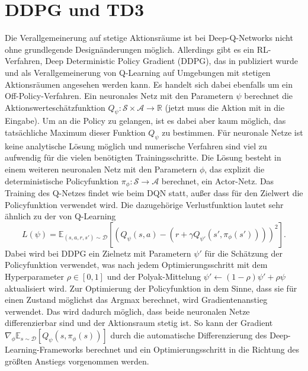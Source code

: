 \section{DDPG und TD3}
Die Verallgemeinerung auf stetige Aktionsräume ist bei Deep-Q-Networks nicht ohne grundlegende Designänderungen möglich.
Allerdings gibt es ein RL-Verfahren, Deep Deterministic Policy Gradient (DDPG), das in \cite{10.5555/3044805.3044850} publiziert wurde und als Verallgemeinerung von Q-Learning auf Umgebungen mit stetigen Aktionsräumen angesehen werden kann.
Es handelt sich dabei ebenfalls um ein Off-Policy-Verfahren.
Ein neuronales Netz mit den Parametern $\psi$ berechnet die Aktionswerteschätzfunktion $Q_\psi: \mathcal{S} \times \mathcal{A}\rightarrow \mathbb{R}$ (jetzt muss die Aktion mit in die Eingabe).
Um an die Policy zu gelangen, ist es dabei aber kaum möglich, das tatsächliche Maximum dieser Funktion $Q_\psi$ zu bestimmen.
Für neuronale Netze ist keine analytische Lösung möglich und numerische Verfahren sind viel zu aufwendig für die vielen benötigten Trainingsschritte.
Die Lösung besteht in einem weiteren neuronalen Netz mit den Parametern $\phi$, das explizit die deterministische Policyfunktion $\pi_\phi: \mathcal{S} \rightarrow \mathcal{A}$ berechnet, ein Actor-Netz.
Das Training des Q-Netzes findet wie beim DQN statt, außer dass für den Zielwert die Policyfunktion verwendet wird.
Die dazugehörige Verlustfunktion lautet sehr ähnlich zu der von Q-Learning
\begin{equation}
	L(\psi) = \mathbb{E}_{(s, a, r, s')\sim\mathcal{D}}\left[\left(Q_\psi(s,a)-\left(r+\gamma Q_{\psi'}(s',\pi_\phi(s'))\right)\right)^2\right].
\end{equation}
Dabei wird bei DDPG ein Zielnetz mit Parametern $\psi'$ für die Schätzung der Policyfunktion verwendet, was nach jedem Optimierungsschritt mit dem Hyperparameter $\rho \in [0, 1]$ und der Polyak-Mittelung $\psi' \leftarrow (1 - \rho) \psi' + \rho \psi$ aktualisiert wird.
Zur Optimierung der Policyfunktion in dem Sinne, dass sie für einen Zustand möglichst das Argmax berechnet, wird Gradientenanstieg verwendet.
Das wird dadurch möglich, dass beide neuronalen Netze differenzierbar sind und der Aktionsraum stetig ist.
So kann der Gradient $\nabla_\phi \mathbb{E}_{s\sim\mathcal{D}}\left[Q_\psi(s, \pi_\phi(s))\right]$ durch die automatische Differenzierung des Deep-Learning-Frameworks berechnet und ein Optimierungsschritt in die Richtung des größten Anstiegs vorgenommen werden.

